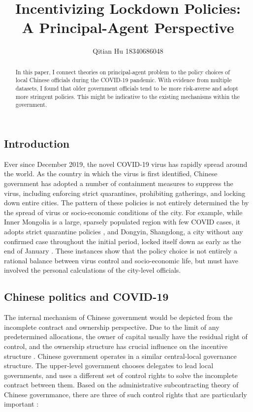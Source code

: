 \documentclass{article}
\title{Incentivizing Lockdown Policies: \\A Principal-Agent Perspective}
\author{Qitian Hu 18340686048}
\begin{document}
\begin{CJK}{UTF8}{gbsn}
\maketitle %
\begin{abstract}
	In this paper, I connect theories on principal-agent problem to the policy choices of local Chinese officials during the COVID-19 pandemic. With evidence from multiple datasets, I found that older government officials tend to be more risk-averse and adopt more stringent policies. This might be indicative to the existing mechanisms within the government. 	
\end{abstract}


\section{Introduction}
Ever since December 2019, the novel COVID-19 virus has rapidly spread around the world. As the country in which the virus is first identified, Chinese government has adopted a number of containment measures to suppress the virus, including enforcing strict quarantines, prohibiting gatherings, and locking down entire cities. 
The pattern of these policies is not entirely determined the by the spread of virus or socio-economic conditions of the city. For example, while Inner Mongolia is a large, sparsely populated region with few COVID cases, it adopts strict quarantine policies \cite{inner mongolia}, and Dongyin, Shangdong, a city without any confirmed case throughout the initial period, locked itself down as early as the end of January \cite{yuhang}. These instances show that the policy choice is not entirely a rational balance between virus control and socio-economic life, but must have involved the personal calculations of the city-level officials. 


\subsection{Chinese politics and COVID-19} 

The internal mechanism of Chinese government would be depicted from the incomplete contract and ownership perspective. Due to the limit of any predetermined allocations, the owner of capital usually have the residual right of control, and the ownership structure has crucial influence on the incentive structure \cite{holmstrom and roberts 1998}. Chinese government operates in a similar central-local governance structure. The upper-level government chooses delegates to lead local governments, and uses a different set of control rights to solve the incomplete contract between them. Based on the administrative subcontracting theory of Chinese governmance, there are three of such control rights that are particularly important \cite{zxg} : 


\end{CJK}
\end{document}
